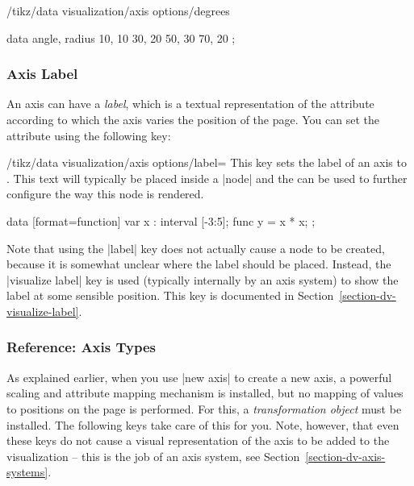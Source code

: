 \begin{key}{/tikz/data visualization/axis options/degrees}
\begin{codeexample}[]
\tikz {}
    data {
      angle, radius
      10, 10
      30, 20
      50, 30
      70, 20
    };
\end{codeexample}
\end{key}


\subsubsection{Axis Label}

An axis can have a \emph{label}, which is a textual representation of
the attribute according to which the axis varies the position of the
page. You can set the attribute using the following key:


\begin{key}{/tikz/data visualization/axis options/label=}
  This key sets the label of an axis to . This text will
  typically be placed inside a |node| and the  can be
  used to further configure the way this node is rendered. 
\begin{codeexample}[]
\tikz \datavisualization [scientific axes,
                          x axis = {label=$x$, length=2.5cm},
                          y axis = {label={[fill=blue!20]{$x^2$}}},
                          visualize as smooth line]
 data [format=function] {
   var x : interval [-3:5];
   func y = \value x * \value x;
 };
\end{codeexample}  
\end{key}

Note that using the |label| key does not actually cause a node to be
created, because it is somewhat unclear where the label should be
placed. Instead, the |visualize label| key is used (typically
internally by an axis system) to show the label at some sensible
position. This key is documented in
Section~\ref{section-dv-visualize-label}. 



\subsubsection{Reference: Axis Types}

\label{section-dv-reference-axis-types}

As explained earlier, when you use |new axis| to create a new axis,
a powerful scaling and attribute mapping mechanism is installed, but
no mapping of values to positions on the page is performed. For this,
a \emph{transformation object} must be installed. The following keys
take care of this for you. Note, however, that even these keys do not
cause a visual representation of the axis to be added to the
visualization -- this is the job of an axis system, see
Section~\ref{section-dv-axis-systems}. 

